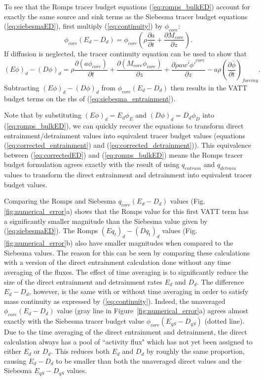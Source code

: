 \documentclass[12pt]{article}
\begin{document}
To see that the Romps tracer budget equations (\ref{eq:romps_bulkED}) account 
for exactly the same source and sink terms as the Siebesma tracer budget 
equations (\ref{eq:siebesmaED}), first multiply (\ref{eq:continuity})
by $\phi_{core}$:
\begin{equation}
    \phi_{core}(E_d - D_d) =
    \phi_{core} \left(\rho \frac{\partial a}{\partial t}
                    + \frac{\partial M_{core}}{\partial z}\right).
\end{equation}
If diffusion is neglected, the tracer continuity equation can be 
used to show that
\begin{equation}
    \label{tracer_budget_Ephi_minus_Dphi}
    (E\phi)_d - (D\phi)_d = 
     \rho \frac{\partial (a \phi_{core})}{\partial t}
   + \frac{\partial (M_{core} \phi_{core})}{\partial z}
   + \frac{\partial \rho a \overline{w' \phi'}^{core}}{\partial z}
   - a \rho \left(\frac{\partial \bar{\phi}}{\partial t}\right)_{forcing}.
\end{equation}
Subtracting $(E\phi)_d - (D\phi)_d$ from $\phi_{core}(E_d - D_d)$ then 
results in the VATT budget terms on the rhs of (\ref{eq:siebesma_entrainment}).  

Note that by substituting $(E \phi)_d = E_d \phi_E$ and 
$(D\phi)_d = D_d \phi_D$ into (\ref{eq:romps_bulkED}), we can quickly recover 
the equations to transform direct entrainment/detrainment values into 
equivalent tracer budget values (equations (\ref{eq:corrected_entrainment}) 
and (\ref{eq:corrected_detrainment})).  This equivalence between 
(\ref{eq:correctedED}) and (\ref{eq:romps_bulkED})
means the Romps tracer budget formulation agrees exactly with the result of 
using $q_{entrain}$ and $q_{detrain}$ values to transform the direct 
entrainment and detrainment into equivalent tracer budget values.  

Comparing the Romps and Siebesma $q_{core}(E_d - D_d)$ values
(Fig. \ref{fig:numerical_error}a) shows that the Romps value for this
first VATT term has a significantly smaller magnitude than the
Siebesma value given by (\ref{eq:siebesmaED}).  
The Romps $(Eq_t)_d - (Dq_t)_d$ values
(Fig. \ref{fig:numerical_error}b) also have smaller magnitudes when
compared to the Siebesma values.  The reason for this can be seen by
comparing these calculations with a version of the direct entrainment
calculation done without any time averaging of the fluxes.  The effect
of time averaging is to significantly reduce the size of the direct
entrainment and detrainment rates $E_d$ and $D_d$.  The difference $E_d-D_d$,
however, is the same with or without time averaging in order to
satisfy mass continuity as expressed by (\ref{eq:continuity}).
Indeed, the unaveraged $\phi_{core}(E_d - D_d)$ value (gray line in
Figure~\ref{fig:numerical_error}a) agrees almost exactly with the
Siebesma tracer budget value $\phi_{core}(E_{qS} - D_{qS})$ (dotted
line).  Due to the time averaging of the direct entrainment and
detrainment, the direct calculation always has a pool of ``activity
flux" which has not yet been assigned to either $E_d$ or $D_d$.  This
reduces both $E_d$ and $D_d$ by roughly the same proportion, causing
$E_d-D_d$ to be smaller than both the unaveraged direct values and the
Siebesma $E_{qS}-D_{qS}$ values.
\end{document}
